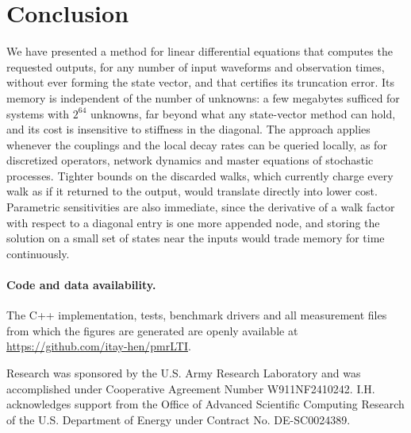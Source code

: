 \documentclass[aps,pra,superscriptaddress,floatfix,longbibliography,twocolumn]{revtex4-2}
\begin{document}
\section{Conclusion}\label{sec:discussion}

We have presented a method for linear differential equations that computes the requested outputs, for any number of input waveforms and observation times, without ever forming the state vector, and that certifies its truncation error. Its memory is independent of the number of unknowns: a few megabytes sufficed for systems with $2^{64}$ unknowns, far beyond what any state-vector method can hold, and its cost is insensitive to stiffness in the diagonal. The approach applies whenever the couplings and the local decay rates can be queried locally, as for discretized operators, network dynamics and master equations of stochastic processes. Tighter bounds on the discarded walks, which currently charge every walk as if it returned to the output, would translate directly into lower cost. Parametric sensitivities are also immediate, since the derivative of a walk factor with respect to a diagonal entry is one more appended node, and storing the solution on a small set of states near the inputs would trade memory for time continuously.

\paragraph*{Code and data availability.} The C++ implementation, tests, benchmark drivers and all measurement files from which the figures are generated are openly available at \url{https://github.com/itay-hen/pmrLTI}.

\begin{acknowledgments}
Research was sponsored by the U.S. Army Research Laboratory and was accomplished under Cooperative Agreement Number W911NF2410242. I.H. acknowledges support from the Office of Advanced Scientific Computing Research of the U.S. Department of Energy under Contract No. DE-SC0024389.
\end{acknowledgments}


\end{document}
